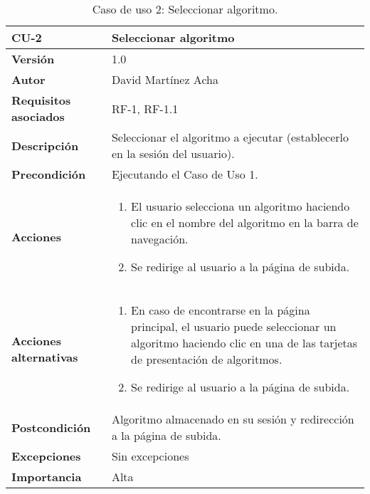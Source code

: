 \begin{table}[p]
	\centering
	\begin{tabularx}{\linewidth}{ p{} p{} }
		\toprule
		\textbf{CU-2}    & \textbf{Seleccionar algoritmo}\\
		\toprule
		\textbf{Versión}              & 1.0    \\
		\textbf{Autor}                & David Martínez Acha \\
		\textbf{Requisitos asociados} & RF-1, RF-1.1 \\
		\textbf{Descripción}          & Seleccionar el algoritmo a ejecutar (establecerlo en la sesión del usuario). \\
		\textbf{Precondición}         & Ejecutando el Caso de Uso 1. \\
		\textbf{Acciones}             &
		\begin{enumerate}
			\def\labelenumi{\arabic{enumi}.}
			\tightlist
			\item El usuario selecciona un algoritmo haciendo clic en el nombre del algoritmo en la barra de navegación.
			\item Se redirige al usuario a la página de subida.
		\end{enumerate}\\
        \textbf{Acciones alternativas}&
		\begin{enumerate}
			\def\labelenumi{\arabic{enumi}.}
			\tightlist
			\item En caso de encontrarse en la página principal, el usuario
		puede seleccionar un algoritmo haciendo clic en una de las tarjetas de
		presentación de algoritmos.
			\item Se redirige al usuario a la página de subida. \end{enumerate}\\
		\textbf{Postcondición}        & Algoritmo almacenado en su sesión y redirección a la página de subida. \\
		\textbf{Excepciones}          & Sin excepciones \\
		\textbf{Importancia}          & Alta \\
		\bottomrule
	\end{tabularx}
	\caption{Caso de uso 2: Seleccionar algoritmo.}
\end{table}

